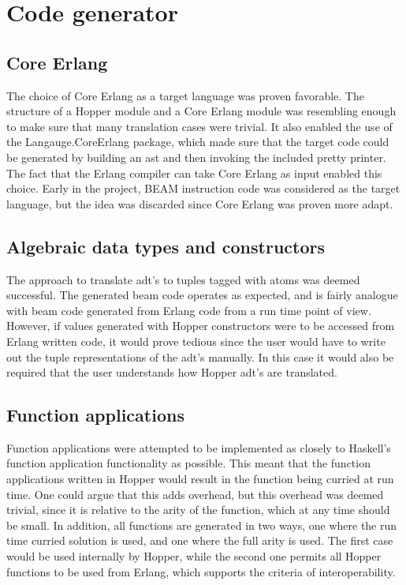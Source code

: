 \section{Code generator}


\subsection{Core Erlang}

The choice of Core Erlang as a target language was proven favorable. The structure of a Hopper module and a Core Erlang module was resembling enough to make sure that many translation cases were trivial. It also enabled the use of the Langauge.CoreErlang \cite{CoreErlang} package, which made sure that the target code could be generated by building an \acrshort{ast} and then invoking the included pretty printer. The fact that the Erlang compiler can take Core Erlang as input enabled this choice. Early in the project, BEAM instruction code was considered as the target language, but the idea was discarded since Core Erlang was proven more adapt.

\subsection{Algebraic data types and constructors}

The approach to translate \acrshort{adt}'s to tuples tagged with atoms was deemed successful. The generated beam code operates as expected, and is fairly analogue with beam code generated from Erlang code from a run time point of view. However, if values generated with Hopper constructors were to be accessed from Erlang written code, it would prove tedious since the user would have to write out the tuple representations of the \acrshort{adt}'s manually. In this case it would also be required that the user understands how Hopper \acrshort{adt}'s are translated.

\subsection{Function applications}

Function applications were attempted to be implemented as closely to Haskell's function application functionality as possible. This meant that the function applications written in Hopper would result in the function being curried at run time. One could argue that this adds overhead, but this overhead was deemed trivial, since it is relative to the arity of the function, which at any time should be small. In addition, all functions are generated in two ways, one where the run time curried solution is used, and one where the full arity is used. The first case would be used internally by Hopper, while the second one permits all Hopper functions to be used from Erlang, which supports  the criteria of interoperability.

